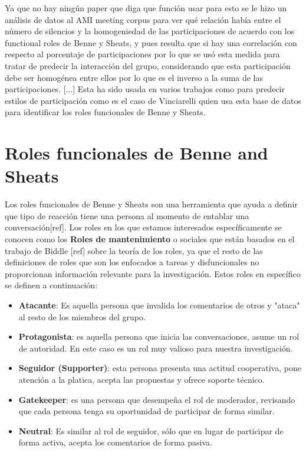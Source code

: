 Ya que no hay ningún paper que diga que función usar para esto se le hizo un análisis de datos al AMI meeting corpus para ver qué relación había entre el número de silencios y la homogeniedad de las participaciones de acuerdo con los functional roles de Benne y Sheats, y pues resulta que si hay una correlación con respecto al porcentaje de participaciones por lo que se usó esta medida para tratar de predecir la interacción del grupo, considerando que esta participación debe ser homogénea entre ellos por lo que es el inverso a la suma de las participaciones.
[...]
Esta ha sido usada en varios trabajos como para predecir estilos de participación como es el caso de Vinciarelli\cite{VinciarelliUnderstandingCorpus} quien usa esta base de datos para identificar los roles funcionales de Benne y Sheats\cite{benne_sheats}. 

\section{Roles funcionales de Benne and Sheats }
Los roles funcionales de Benne y Sheats son una herramienta que ayuda a definir que tipo de reacción tiene una persona al momento de entablar una conversación[ref]. Los roles en los que estamos interesados específicamente se conocen como los \textbf{Roles de mantenimiento} o sociales que están basados en el trabajo de Biddle [ref] sobre la teoría de los roles, ya que el resto de las definiciones de roles que son los enfocados a tareas y disfuncionales no proporcionan información relevante para la investigación. Estos roles en específico se definen a continuación:

\begin{itemize}\break

\item \textbf{Atacante}: Es aquella persona que invalida los comentarios de otros y "ataca" al resto de los miembros del grupo.
\item \textbf{Protagonista}: es aquella persona que inicia las conversaciones, asume un rol de autoridad. En este caso es un rol muy valioso para nuestra investigación.
\item \textbf{Seguidor (Supporter)}: esta persona presenta una actitud cooperativa, pone atención a la platica, acepta las propuestas y ofrece soporte técnico.
\item \textbf{Gatekeeper}: es una persona que desempeña el rol de moderador, revisando que cada persona tenga su oportunidad de participar de forma similar.
\item \textbf{Neutral}: Es similar al rol de seguidor, sólo que en lugar de participar de forma activa, acepta los comentarios de forma pasiva.
\end{itemize}

